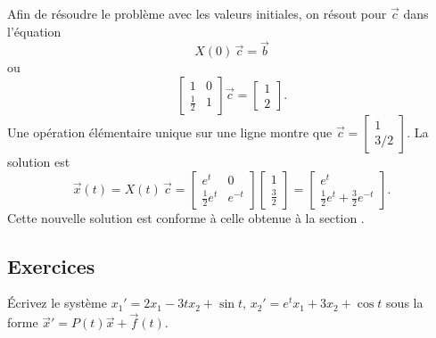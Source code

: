 \begin{example}
Afin de résoudre le problème avec les valeurs initiales, on résout pour $\vec{c}$ dans l'équation
\begin{equation*}
X(0)\,\vec{c} = \vec{b}
\end{equation*}
ou
\begin{equation*}
\begin{bmatrix}
1 & 0 \\
\frac{1}{2} & 1
\end{bmatrix} 
\vec{c} = 
\begin{bmatrix}
1 \\ 2
\end{bmatrix} .
\end{equation*}
Une opération élémentaire unique sur une ligne montre que
$\vec{c} =
\left[ \begin{smallmatrix} 1 \\ 3/2 \end{smallmatrix} \right]$.
La solution est
\begin{equation*}
\vec{x}(t) = 
X(t)\,\vec{c} = 
\begin{bmatrix}
e^t & 0 \\
\frac{1}{2} e^t & e^{-t}
\end{bmatrix}
\begin{bmatrix}
1 \\ \frac{3}{2}
\end{bmatrix} =
\begin{bmatrix}
e^t \\
\frac{1}{2} e^t + \frac{3}{2} e^{-t}
\end{bmatrix} .
\end{equation*}
Cette nouvelle solution est conforme à celle obtenue à la section .
\end{example}

\subsection{Exercices}

\begin{exercise}
Écrivez le système $x_1' = 2 x_1 - 3t x_2 + \sin t$,
$x_2' = e^t x_1 + 3 x_2 + \cos t$ sous la forme
${\vec{x}}' = P(t) \vec{x} + \vec{f}(t)$.
\end{exercise}

